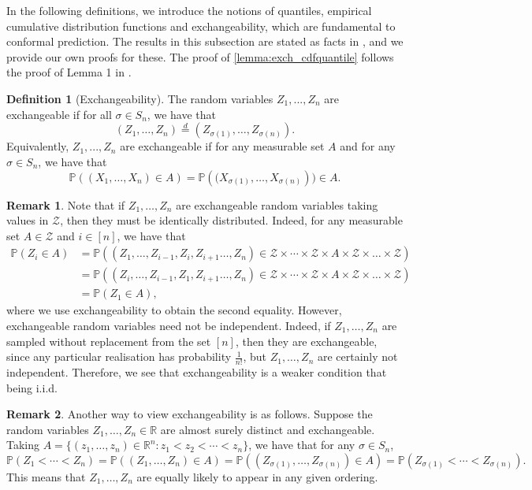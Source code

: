 \documentclass[11pt, titlepage]{article} %
\newcommand{\Prob}[1]{\mathbb{P}\left( #1 \right)}
\numberwithin{equation}{section}
\theoremstyle{definition}
\newtheorem{definition}{Definition}
\newtheorem{remark}{Remark}
\numberwithin{theorem}{section}
\numberwithin{lemma}{section}
\numberwithin{corollary}{section}
\numberwithin{proposition}{section}
\numberwithin{definition}{section}
\numberwithin{remark}{section}
\begin{document}
In the following definitions, we introduce the notions of quantiles, empirical cumulative distribution functions and exchangeability, which are fundamental to conformal prediction. The results in this subsection are stated as facts in \cite{angelopoulos2024theoreticalfoundationsconformalprediction}, and we provide our own proofs for these. The proof of \cref{lemma:exch_cdfquantile} follows the proof of Lemma 1 in \cite{romano2019_CQR}.

\begin{definition}[Exchangeability]
    The random variables \(Z_1, ..., Z_n\) are exchangeable if for all \(\sigma \in S_n\), we have that \[(Z_1, \ldots, Z_n) \overset{d}{=} (Z_{\sigma(1)}, \ldots, Z_{\sigma(n)}).\] Equivalently, \(Z_1, ..., Z_n\) are exchangeable if for any measurable set \(A\) and for any \(\sigma \in S_n\), we have that \[\Prob{(X_1, \ldots, X_n) \in A} = \Prob{(X_{\sigma(1)}, \ldots, X_{\sigma(n)}}) \in A.\]
\label{defn:exch}
\end{definition}

\begin{remark}
Note that if \(Z_1, \ldots, Z_n\) are exchangeable random variables taking values in \(\mathcal{Z}\), then they must be identically distributed. Indeed, for any measurable set \(A \in \mathcal{Z}\) and \(i \in [n]\), we have that \begin{align*} 
    \Prob{Z_i \in A} &= \Prob{(Z_1, \ldots, Z_{i-1}, Z_i, Z_{i+1} \ldots, Z_n) \in \mathcal{Z} \times \cdots \times \mathcal{Z} \times A \times \mathcal{Z} \times \ldots \times \mathcal{Z}} \\
    &= \Prob{(Z_i, \ldots, Z_{i-1}, Z_1, Z_{i+1} \ldots, Z_n) \in \mathcal{Z} \times \cdots \times \mathcal{Z} \times A \times \mathcal{Z} \times \ldots \times \mathcal{Z}} \\
    &= \Prob{Z_1 \in A},
\end{align*} where we use exchangeability to obtain the second equality. However, exchangeable random variables need not be independent. Indeed, if \(Z_1, \ldots, Z_n\) are sampled without replacement from the set \([n]\), then they are exchangeable, since any particular realisation has probability \(\frac{1}{n!}\), but \(Z_1, \ldots, Z_n\) are certainly not independent. Therefore, we see that exchangeability is a weaker condition that being i.i.d.
\label{rmk:exch_dist}
\end{remark}

\begin{remark}
    Another way to view exchangeability is as follows. Suppose the random variables \(Z_1, \ldots, Z_n \in \mathbb{R}\) are almost surely distinct and exchangeable. Taking \(A = \{(z_1, \ldots, z_n) \in \mathbb{R}^n : z_1 < z_2 < \cdots < z_n \}\), we have that for any \(\sigma \in S_n\), \[\Prob{Z_1 < \cdots < Z_n} = \Prob{(Z_1, \ldots, Z_n) \in A} = \Prob{(Z_{\sigma(1)}, \ldots, Z_{\sigma(n)}) \in A} = \Prob{Z_{\sigma(1)} < \cdots < Z_{\sigma(n)}}.\] This means that \(Z_1, \ldots, Z_n\) are equally likely to appear in any given ordering.
\label{rmk:exch_ordering}
\end{remark}
\end{document}
